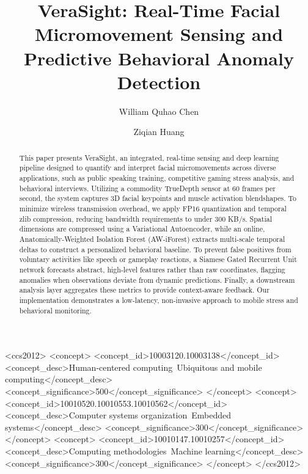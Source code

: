 \documentclass[sigconf]{acmart}
\begin{document}
\title[VeraSight: Real-Time Facial Micromovement Sensing]{VeraSight: Real-Time Facial Micromovement Sensing and Predictive Behavioral Anomaly Detection}

\author{William Quhao Chen}

\author{Ziqian Huang}

\renewcommand{\shortauthors}{Chen and Huang}

\begin{abstract}
This paper presents VeraSight, an integrated, real-time sensing and deep learning pipeline designed to quantify and interpret facial micromovements across diverse applications, such as public speaking training, competitive gaming stress analysis, and behavioral interviews. Utilizing a commodity TrueDepth sensor at 60 frames per second, the system captures 3D facial keypoints and muscle activation blendshapes. To minimize wireless transmission overhead, we apply FP16 quantization and temporal zlib compression, reducing bandwidth requirements to under 300 KB/s. Spatial dimensions are compressed using a Variational Autoencoder, while an online, Anatomically-Weighted Isolation Forest (AW-iForest) extracts multi-scale temporal deltas to construct a personalized behavioral baseline. To prevent false positives from voluntary activities like speech or gameplay reactions, a Siamese Gated Recurrent Unit network forecasts abstract, high-level features rather than raw coordinates, flagging anomalies when observations deviate from dynamic predictions. Finally, a downstream analysis layer aggregates these metrics to provide context-aware feedback. Our implementation demonstrates a low-latency, non-invasive approach to mobile stress and behavioral monitoring.
\end{abstract}

\begin{CCSXML}
<ccs2012>
  <concept>
    <concept_id>10003120.10003138</concept_id>
    <concept_desc>Human-centered computing~Ubiquitous and mobile computing</concept_desc>
    <concept_significance>500</concept_significance>
  </concept>
  <concept>
    <concept_id>10010520.10010553.10010562</concept_id>
    <concept_desc>Computer systems organization~Embedded systems</concept_desc>
    <concept_significance>300</concept_significance>
  </concept>
  <concept>
    <concept_id>10010147.10010257</concept_id>
    <concept_desc>Computing methodologies~Machine learning</concept_desc>
    <concept_significance>300</concept_significance>
  </concept>
</ccs2012>
\end{CCSXML}
\end{document}
